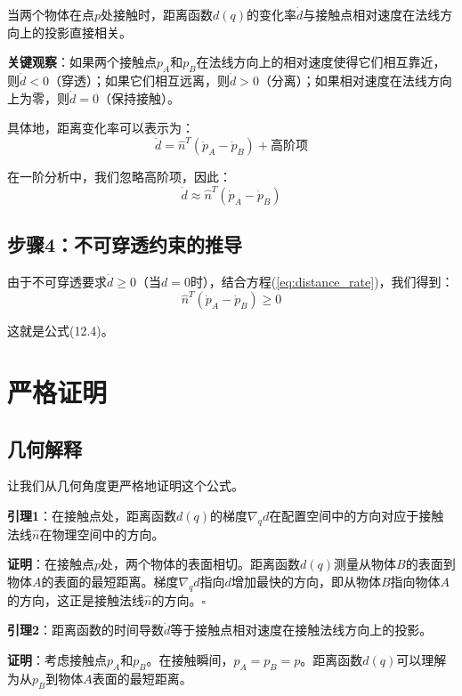 \documentclass[12pt,a4paper]{article}
\begin{document}
当两个物体在点$p$处接触时，距离函数$d(q)$的变化率$\dot{d}$与接触点相对速度在法线方向上的投影直接相关。

\textbf{关键观察}：如果两个接触点$p_A$和$p_B$在法线方向上的相对速度使得它们相互靠近，则$\dot{d} < 0$（穿透）；如果它们相互远离，则$\dot{d} > 0$（分离）；如果相对速度在法线方向上为零，则$\dot{d} = 0$（保持接触）。

具体地，距离变化率可以表示为：
\begin{equation}
\dot{d} = \hat{n}^T (\dot{p}_A - \dot{p}_B) + \text{高阶项}
\label{eq:distance_rate}
\end{equation}

在一阶分析中，我们忽略高阶项，因此：
\begin{equation}
\dot{d} \approx \hat{n}^T (\dot{p}_A - \dot{p}_B)
\end{equation}

\subsection{步骤4：不可穿透约束的推导}

由于不可穿透要求$\dot{d} \geq 0$（当$d = 0$时），结合方程(\ref{eq:distance_rate})，我们得到：
\begin{equation}
\hat{n}^T (\dot{p}_A - \dot{p}_B) \geq 0
\end{equation}

这就是公式(12.4)。

\section{严格证明}

\subsection{几何解释}

让我们从几何角度更严格地证明这个公式。

\textbf{引理1}：在接触点处，距离函数$d(q)$的梯度$\nabla_q d$在配置空间中的方向对应于接触法线$\hat{n}$在物理空间中的方向。

\textbf{证明}：在接触点$p$处，两个物体的表面相切。距离函数$d(q)$测量从物体$B$的表面到物体$A$的表面的最短距离。梯度$\nabla_q d$指向$d$增加最快的方向，即从物体$B$指向物体$A$的方向，这正是接触法线$\hat{n}$的方向。$\square$

\textbf{引理2}：距离函数的时间导数$\dot{d}$等于接触点相对速度在接触法线方向上的投影。

\textbf{证明}：考虑接触点$p_A$和$p_B$。在接触瞬间，$p_A = p_B = p$。距离函数$d(q)$可以理解为从$p_B$到物体$A$表面的最短距离。
\end{document}
